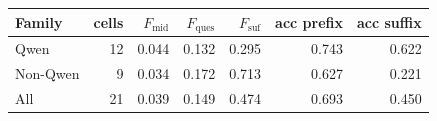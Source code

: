 \begin{tabular}{lrrrrrr}
\toprule
Family & cells & $F_{\mathrm{mid}}$ & $F_{\mathrm{ques}}$ & $F_{\mathrm{suf}}$ & acc prefix & acc suffix \\
\midrule
Qwen & 12 & 0.044 & 0.132 & 0.295 & 0.743 & 0.622 \\
Non-Qwen & 9 & 0.034 & 0.172 & 0.713 & 0.627 & 0.221 \\
All & 21 & 0.039 & 0.149 & 0.474 & 0.693 & 0.450 \\
\bottomrule
\end{tabular}
